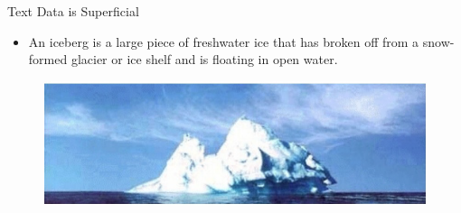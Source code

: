 \begin{frame}[allowframebreaks]{Text Data is Superficial}
    \large
    \begin{itemize}
        \item An iceberg is a large piece of freshwater ice that has broken off from a snow-formed glacier or ice shelf and is floating in open water.
    \end{itemize}
    \vspace{1em}
    \begin{figure}
        \centering
        \includegraphics[width=\textwidth,height=0.7\textheight,keepaspectratio]{images/nlp-intro/iceberg-1.png}
    \end{figure}    
\end{frame}

